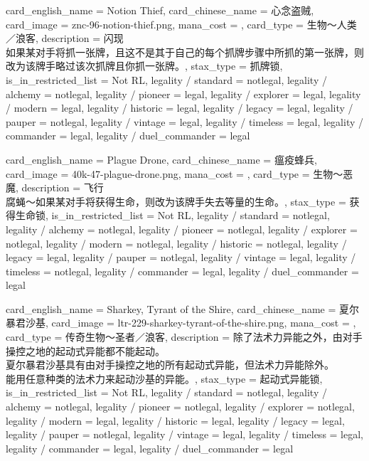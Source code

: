 \documentclass[lang = cn, color = black, 10pt]{AllThatStax}
\begin{document}
\card
{
	card_english_name = {Notion Thief},
	card_chinese_name = {心念盗贼},
	card_image = znc-96-notion-thief.png,
	mana_cost = ,
	card_type = 生物～人类／浪客,
	description = {闪现\\
如果某对手将抓一张牌，且这不是其于自己的每个抓牌步骤中所抓的第一张牌，则改为该牌手略过该次抓牌且你抓一张牌。},
	stax_type = 抓牌锁,
	is_in_restricted_list = Not RL,
	legality / standard = notlegal,
	legality / alchemy = notlegal,
	legality / pioneer = legal,
	legality / explorer = legal,
	legality / modern = legal,
	legality / historic = legal,
	legality / legacy = legal,
	legality / pauper = notlegal,
	legality / vintage = legal,
	legality / timeless = legal,
	legality / commander = legal,
	legality / duel_commander = legal
}

\card
{
	card_english_name = {Plague Drone},
	card_chinese_name = {瘟疫蜂兵},
	card_image = 40k-47-plague-drone.png,
	mana_cost = ,
	card_type = 生物～恶魔,
	description = {飞行\\
腐蝇～如果某对手将获得生命，则改为该牌手失去等量的生命。},
	stax_type = 获得生命锁,
	is_in_restricted_list = Not RL,
	legality / standard = notlegal,
	legality / alchemy = notlegal,
	legality / pioneer = notlegal,
	legality / explorer = notlegal,
	legality / modern = notlegal,
	legality / historic = notlegal,
	legality / legacy = legal,
	legality / pauper = notlegal,
	legality / vintage = legal,
	legality / timeless = notlegal,
	legality / commander = legal,
	legality / duel_commander = legal
}

\card
{
	card_english_name = {Sharkey, Tyrant of the Shire},
	card_chinese_name = {夏尔暴君沙基},
	card_image = ltr-229-sharkey-tyrant-of-the-shire.png,
	mana_cost = ,
	card_type = 传奇生物～圣者／浪客,
	description = {除了法术力异能之外，由对手操控之地的起动式异能都不能起动。\\
夏尔暴君沙基具有由对手操控之地的所有起动式异能，但法术力异能除外。\\
能用任意种类的法术力来起动沙基的异能。},
	stax_type = 起动式异能锁,
	is_in_restricted_list = Not RL,
	legality / standard = notlegal,
	legality / alchemy = notlegal,
	legality / pioneer = notlegal,
	legality / explorer = notlegal,
	legality / modern = legal,
	legality / historic = legal,
	legality / legacy = legal,
	legality / pauper = notlegal,
	legality / vintage = legal,
	legality / timeless = legal,
	legality / commander = legal,
	legality / duel_commander = legal
}
\end{document}
